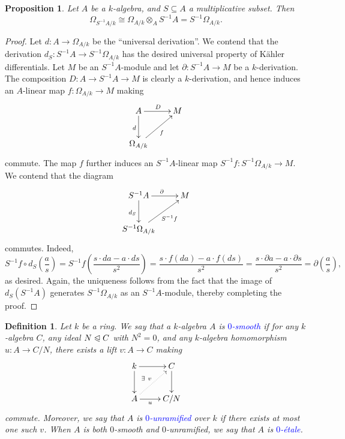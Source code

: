 \documentclass[10pt]{article}
\theoremstyle{thmstyle}
\newtheorem{proposition}[theorem]{Proposition}
\theoremstyle{defstyle}
\newtheorem{definition}[theorem]{Definition}
\newcommand{\define}[1]{\textcolor{blue}{\textit{#1}}}
\newcommand{\noreq}{\trianglelefteqslant}
\begin{document}
\begin{proposition}
    Let $A$ be a $k$-algebra, and $S\subseteq A$ a multiplicative subset. Then 
    \begin{equation*}
        \Omega_{S^{-1}A/k}\cong\Omega_{A/k}\otimes_A S^{-1}A = S^{-1}\Omega_{A/k}.
    \end{equation*}
\end{proposition}
\begin{proof}
    Let $d\colon A\to \Omega_{A/k}$ be the ``universal derivation''. We contend that the derivation $d_S\colon S^{-1}A\to S^{-1}\Omega_{A/k}$ has the desired universal property of K\"ahler differentials. Let $M$ be an $S^{-1}A$-module and let $\partial\colon S^{-1}A\to M$ be a $k$-derivation. The composition $D\colon A\to S^{-1}A\to M$ is clearly a $k$-derivation, and hence induces an $A$-linear map $f\colon \Omega_{A/k}\to M$ making 
    \begin{equation*}
        \xymatrix {
            A\ar[r]^D\ar[d]_d & M\\
            \Omega_{A/k}\ar[ru]_f
        }
    \end{equation*}
    commute. The map $f$ further induces an $S^{-1}A$-linear map $S^{-1}f\colon S^{-1}\Omega_{A/k}\to M$. We contend that the diagram 
    \begin{equation*}
        \xymatrix {
            S^{-1}A\ar[r]^{\partial}\ar[d]_{d_S} & M\\
            S^{-1}\Omega_{A/k}\ar[ru]_{S^{-1}f}
        }
    \end{equation*}
    commutes. Indeed, 
    \begin{equation*}
        S^{-1}f\circ d_S\left(\frac{a}{s}\right) = S^{-1}f\left(\frac{s\cdot da - a\cdot ds}{s^2}\right) = \frac{s\cdot f(da) - a\cdot f(ds)}{s^2} = \frac{s\cdot\partial a - a\cdot\partial s}{s^2} = \partial\left(\frac{a}{s}\right),
    \end{equation*}
    as desired. Again, the uniqueness follows from the fact that the image of $d_S(S^{-1}A)$ generates $S^{-1}\Omega_{A/k}$ as an $S^{-1}A$-module, thereby completing the proof.
\end{proof}

\begin{definition}
    Let $k$ be a ring. We say that a $k$-algebra $A$ is \define{$0$-smooth} if for any $k$-algebra $C$, any ideal $N\noreq C$ with $N^2 = 0$, and any $k$-algebra homomorphism $u\colon A\to C/N$, there exists a lift $v\colon A\to C$ making 
    \begin{equation*}
        \xymatrix {
            k\ar[r]\ar[d] & C\ar[d]\\
            A\ar[r]_-u\ar@{.>}[ru]^{\exists~v} & C/N
        }
    \end{equation*}
    commute. Moreover, we say that $A$ is \define{$0$-unramified} over $k$ if there exists at most one such $v$. When $A$ is both $0$-smooth and $0$-unramified, we say that $A$ is \define{$0$-\'etale}.
\end{definition}
\end{document}
